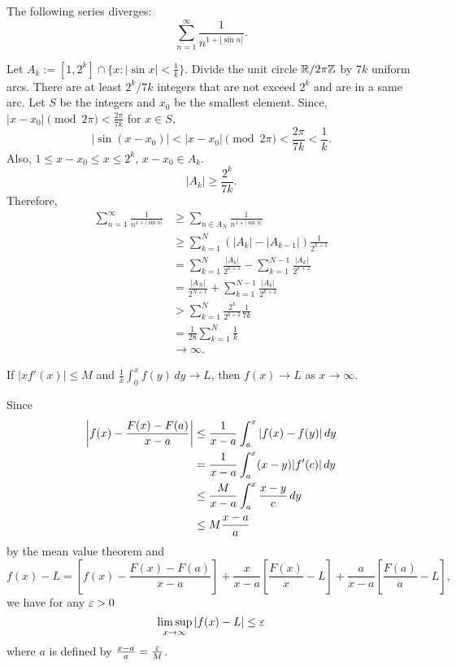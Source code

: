 \documentclass[11pt]{article}
\begin{document}
\begin{prb}
The following series diverges: \[\sum_{n=1}^\infty\frac1{n^{1+|\sin n|}}.\]
\end{prb}
\begin{sol}
Let $A_k:=[1,2^k]\cap\{x:|\sin x|<\frac1k\}$.
Divide the unit circle $\mathbb{R}/2\pi\mathbb{Z}$ by $7k$ uniform arcs.
There are at least $2^k/7k$ integers that are not exceed $2^k$ and are in a same arc.
Let $S$ be the integers and $x_0$ be the smallest element.
Since, $|x-x_0|\pmod{2\pi}<\frac{2\pi}{7k}$ for $x\in S$,
\[|\sin(x-x_0)|<|x-x_0|\pmod{2\pi}<\frac{2\pi}{7k}<\frac1k.\]
Also, $1\le x-x_0\le x\le2^k$, $x-x_0\in A_k$.
\[|A_k|\ge\frac{2^k}{7k}.\]
Therefore,
\begin{align*}
\sum_{n=1}^\infty\frac1{n^{1+|\sin n|}}
&\ge\sum_{n\in A_N}\frac1{n^{1+|\sin n|}}\\
&\ge\sum_{k=1}^N(|A_k|-|A_{k-1}|)\frac1{2^{k+1}}\\
&=\sum_{k=1}^N\frac{|A_k|}{2^{k+1}}-\sum_{k=1}^{N-1}\frac{|A_k|}{2^{k+2}}\\
&=\frac{|A_N|}{2^{N+1}}+\sum_{k=1}^{N-1}\frac{|A_k|}{2^{k+2}}\\
&>\sum_{k=1}^N\frac{2^k}{2^{k+2}}\frac1{7k}\\
&=\frac1{28}\sum_{k=1}^N\frac1k\\
&\to\infty.
\end{align*}
\end{sol}

\clearpage
\begin{prb}
If $|xf'(x)|\le M$ and $\frac1x\int_0^xf(y)\,dy\to L$, then $f(x)\to L$ as $x\to\infty$.
\end{prb}
\begin{sol}
Since
\begin{align*}
\left\lvert f(x)-\frac{F(x)-F(a)}{x-a}\right\rvert
&\le\frac1{x-a}\int_a^x|f(x)-f(y)|\,dy\\
&=\frac1{x-a}\int_a^x(x-y)|f'(c)|\,dy\\
&\le\frac M{x-a}\int_a^x\frac{x-y}c\,dy\\
&\le M\frac{x-a}a
\end{align*}
by the mean value theorem and 
\[f(x)-L=\left[f(x)-\frac{F(x)-F(a)}{x-a}\right]+\frac x{x-a}\left[\frac{F(x)}x-L\right]+\frac a{x-a}\left[\frac{F(a)}a-L\right],\]
we have for any $\varepsilon>0$
\[\limsup_{x\to\infty}|f(x)-L|\le\e\]
where $a$ is defined by $\frac{x-a}a=\frac{\varepsilon} M$.
\end{sol}
\end{document}
